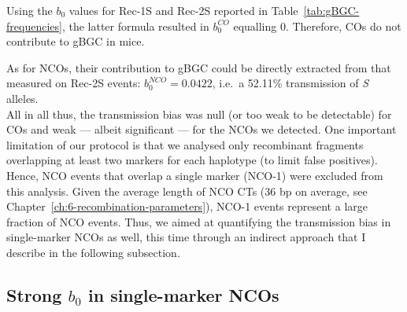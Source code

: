 Using the $b_0$ values for Rec-1S and Rec-2S reported in Table~\ref{tab:gBGC-frequencies}, the latter formula resulted in $b_0^{CO}$ equalling 0. 
Therefore, COs do not contribute to gBGC in mice.

As for NCOs, their contribution to gBGC could be directly extracted from that measured on Rec-2S events: $b_0^{NCO} = 0.0422$, i.e.\ a 52.11\% transmission of \textit{S} alleles.\\

All in all thus, the transmission bias was null (or too weak to be detectable) for COs and weak — albeit significant — for the NCOs we detected.
One important limitation of our protocol is that we analysed only recombinant fragments overlapping at least two markers for each haplotype (to limit false positives).
Hence, NCO events that overlap a single marker (NCO-1) were excluded from this analysis.
Given the average length of NCO CTs (36 bp on average, see Chapter~\ref{ch:6-recombination-parameters}), NCO-1 events represent a large fraction of NCO events.
Thus, we aimed at quantifying the transmission bias in single-marker NCOs as well, this time through an indirect approach that I describe in the following subsection.



%
%
\subsection{Strong $b_0$ in single-marker NCOs}

%
%


